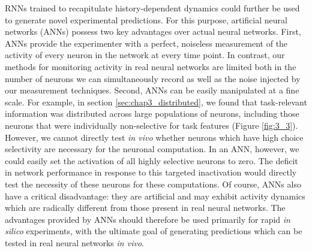 \bigskip
RNNs trained to recapitulate history-dependent dynamics could further be used to generate novel experimental predictions. For this purpose, artificial neural networks (ANNs) possess two key advantages over actual neural networks. First, ANNs provide the experimenter with a perfect, noiseless measurement of the activity of every neuron in the network at every time point. In contrast, our methods for monitoring activity in real neural networks are limited both in the number of neurons we can simultaneously record as well as the noise injected by our measurement techniques. Second, ANNs can be easily manipulated at a fine scale. For example, in section \ref{sec:chap3_distributed}, we found that task-relevant information was distributed across large populations of neurons, including those neurons that were individually non-selective for task features (Figure \ref{fig:3_3}). However, we cannot directly test \textit{in vivo} whether neurons which have high choice selectivity are necessary for the neuronal computation. In an ANN, however, we could easily set the activation of all highly selective neurons to zero. The deficit in network performance in response to this targeted inactivation would directly test the necessity of these neurons for these computations. Of course, ANNs also have a critical disadvantage: they are artificial and may exhibit activity dynamics which are radically different from those present in real neural networks. The advantages provided by ANNs should therefore be used primarily for rapid \textit{in silico }experiments, with the ultimate goal of generating predictions which can be tested in real neural networks \textit{in vivo}. 









